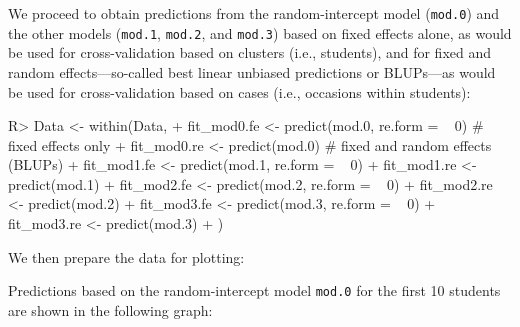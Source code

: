 \documentclass[
]{jss}
\begin{document}
We proceed to obtain predictions from the random-intercept model
(\texttt{mod.0}) and the other models (\texttt{mod.1}, \texttt{mod.2},
and \texttt{mod.3}) based on fixed effects alone, as would be used for
cross-validation based on clusters (i.e., students), and for fixed and
random effects---so-called best linear unbiased predictions or
BLUPs---as would be used for cross-validation based on cases (i.e.,
occasions within students):

\begin{CodeChunk}
\begin{CodeInput}
R> Data <- within(Data, {
+   fit_mod0.fe <- predict(mod.0, re.form = ~ 0) # fixed effects only
+   fit_mod0.re <- predict(mod.0) # fixed and random effects (BLUPs)
+   fit_mod1.fe <- predict(mod.1, re.form = ~ 0)
+   fit_mod1.re <- predict(mod.1)
+   fit_mod2.fe <- predict(mod.2, re.form = ~ 0)
+   fit_mod2.re <- predict(mod.2)
+   fit_mod3.fe <- predict(mod.3, re.form = ~ 0)
+   fit_mod3.re <- predict(mod.3)
+ })
\end{CodeInput}
\end{CodeChunk}

We then prepare the data for plotting:

\begin{CodeChunk}
\end{CodeChunk}

Predictions based on the random-intercept model \texttt{mod.0} for the
first 10 students are shown in the following graph:
\end{document}

